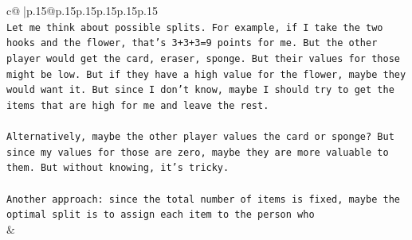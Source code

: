 \documentclass{article}
\begin{document}
{\begin{supertabular}{c@{$\;$}|p{.15\linewidth}@{}p{.15\linewidth}p{.15\linewidth}p{.15\linewidth}p{.15\linewidth}p{.15\linewidth}}
{{{\\ 
\texttt{Let me think about possible splits. For example, if I take the two hooks and the flower, that's 3+3+3=9 points for me. But the other player would get the card, eraser, sponge. But their values for those might be low. But if they have a high value for the flower, maybe they would want it. But since I don't know, maybe I should try to get the items that are high for me and leave the rest.} \\
\\ 
\texttt{Alternatively, maybe the other player values the card or sponge? But since my values for those are zero, maybe they are more valuable to them. But without knowing, it's tricky.} \\
\\ 
\texttt{Another approach: since the total number of items is fixed, maybe the optimal split is to assign each item to the person who} \\
            }
        }
    }
    & \\ \\


\end{supertabular}}
\end{document}
